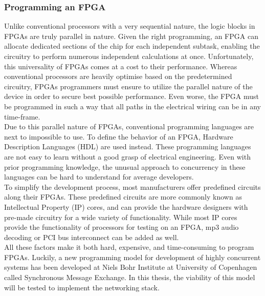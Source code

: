 \subsubsection{Programming an FPGA}
Unlike conventional processors with a very sequential nature, the logic blocks 
in FPGAs are truly parallel in nature. Given the right programming, an FPGA can
allocate dedicated sections of the chip for each independent subtask, enabling
the circuitry to perform numerous independent calculations at once\cite{ni_fpga}.
Unfortunately, this universality of FPGAs comes at a cost to their performance.
Whereas conventional processors are heavily optimise based on the predetermined 
circuitry, FPGAs programmers must ensure to utilize the parallel nature of the
device in order to secure best possible performance. Even worse, the FPGA must 
be programmed in such a way that all paths in the electrical wiring can be 
in any time-frame.\\
Due to this parallel nature of FPGAs, conventional programming languages are 
next to impossible to use. To define the behavior of an FPGA, Hardware 
Description Languages (HDL) are used instead. These programming languages are not easy
to learn without a good grasp of electrical engineering. Even with prior 
programming knowledge, the unusual approach to concurrency in these languages 
can be hard to understand for average developers.\\
To simplify the development process, most manufacturers offer predefined 
circuits along their FPGAs. These predefined circuits are more commonly known
as Intellectual Property (IP) cores, and can provide the hardware designers 
with pre-made circuitry for a wide variety of functionality. While most IP cores
provide the functionality of processors for testing on an FPGA, mp3 audio 
decoding or PCI bus interconnect can be added as well\cite{fpga_for_dummies}.\\
All these factors make it both hard, expensive, and time-consuming to program 
FPGAs. Luckily, a new programming model for development of highly concurrent
systems has been developed at Niels Bohr Institute at University of Copenhagen
called Synchronous Message Exchange. In this thesis, the viability of this 
model will be tested to implement the networking stack.



